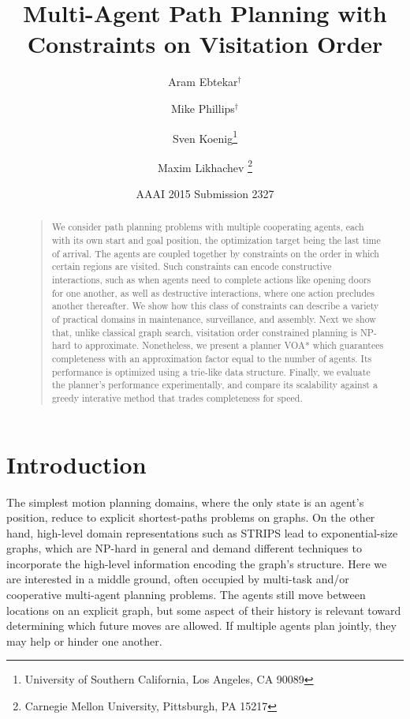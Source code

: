 \documentclass[letterpaper]{article}
\begin{document}
%
\title{Multi-Agent Path Planning with Constraints on Visitation Order}
\author{Aram Ebtekar$^\dagger$ \and Mike Phillips$^\dagger$ \and Sven Koenig\thanks{University of Southern California, Los Angeles, CA 90089} \and Maxim Likhachev%
\thanks{Carnegie Mellon University, Pittsburgh, PA 15217}%
%
}
\author{AAAI 2015 Submission 2327}%
\maketitle
\begin{abstract}
\begin{quote}
We consider path planning problems with multiple cooperating agents, each with its own start and goal position, the optimization target being the last time of arrival. The agents are coupled together by constraints on the order in which certain regions are visited. Such constraints can encode constructive interactions, such as when agents need to complete actions like opening doors for one another, as well as destructive interactions, where one action precludes another thereafter. We show how this class of constraints can describe a variety of practical domains in maintenance, surveillance, and assembly. Next we show that, unlike classical graph search, visitation order constrained planning is NP-hard to approximate. Nonetheless, we present a planner VOA* which guarantees completeness with an approximation factor equal to the number of agents. Its performance is optimized using a trie-like data structure. Finally, we evaluate the planner's performance experimentally, and compare its scalability against a greedy interative method that trades completeness for speed.
\end{quote}
\end{abstract}

\section{Introduction}

The simplest motion planning domains, where the only state is an agent's position, reduce to explicit shortest-paths problems on graphs. On the other hand, high-level domain representations such as STRIPS lead to exponential-size graphs, which are NP-hard in general and demand different techniques to incorporate the high-level information encoding the graph's structure. Here we are interested in a middle ground, often occupied by multi-task and/or cooperative multi-agent planning problems. The agents still move between locations on an explicit graph, but some aspect of their history is relevant toward determining which future moves are allowed. If multiple agents plan jointly, they may help or hinder one another.
\end{document}
